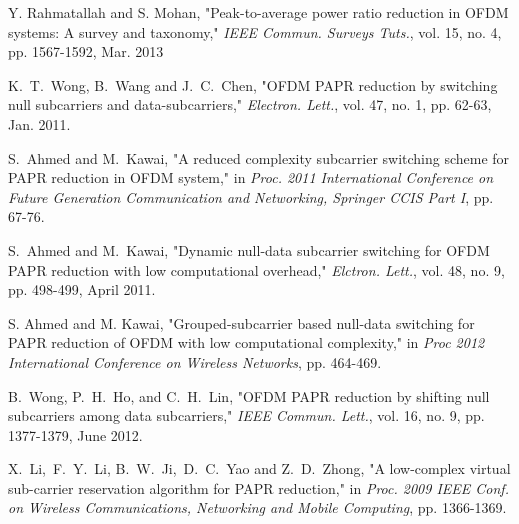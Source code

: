 \documentclass[journal,comsoc]{IEEEtran}
\begin{document}
\ifCLASSOPTIONcaptionsoff
  \newpage
\fi

\begin{thebibliography}{1}

Y. Rahmatallah and S. Mohan, "Peak-to-average power ratio reduction in OFDM systems: A survey and taxonomy," \emph{IEEE Commun. Surveys Tuts.}, vol. 15, no. 4, pp. 1567-1592, Mar. 2013

K.~T.~Wong, B.~Wang and J.~C.~Chen, "OFDM PAPR reduction by switching null subcarriers and data-subcarriers," \emph{Electron. Lett.},
        vol. 47, no. 1, pp. 62-63, Jan. 2011.

S.~Ahmed and M.~Kawai, "A reduced complexity subcarrier switching scheme for PAPR reduction in OFDM system," in \emph{Proc. 2011 International Conference on Future Generation Communication and Networking, Springer CCIS Part I}, pp. 67-76.

S.~Ahmed and M.~Kawai, "Dynamic null-data subcarrier switching for OFDM PAPR reduction with low computational overhead,"
\emph{Elctron. Lett.}, vol. 48, no. 9, pp. 498-499, April 2011.

S. Ahmed and M. Kawai, "Grouped-subcarrier based null-data switching for PAPR reduction of OFDM with low computational complexity," in \emph{Proc 2012 International Conference on Wireless Networks}, pp. 464-469.

B.~Wong, P.~H.~Ho, and C.~H.~Lin, "OFDM PAPR reduction by shifting null subcarriers among data subcarriers," \emph{IEEE Commun. Lett.}, vol. 16, no. 9, pp. 1377-1379, June 2012.

X.~Li,~F.~Y.~Li, B.~W.~Ji,~D.~C.~Yao and Z.~D.~Zhong, "A low-complex virtual sub-carrier reservation algorithm for PAPR reduction," in \emph{Proc. 2009 IEEE Conf. on Wireless Communications, Networking and Mobile Computing}, pp. 1366-1369.

\end{thebibliography}
\end{document}
